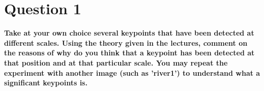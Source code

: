 \section{Question 1}

{\bfseries Take at your own choice several keypoints that have been
detected at different scales. Using the theory given in the lectures, comment on
the reasons of why do you think that a keypoint has been detected at that position
and at that particular scale. You may repeat the experiment with another image
(such as 'river1') to understand what a significant keypoints is.}
